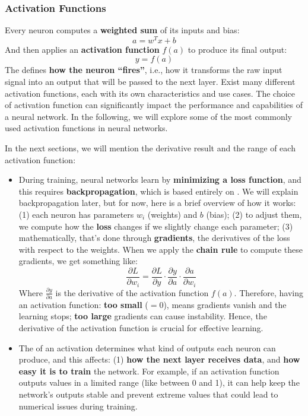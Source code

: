 \subsubsection{Activation Functions}

Every neuron computes a \textbf{weighted sum} of its inputs and bias:
\begin{equation*}
    a = w^{T} x + b
\end{equation*}
And then applies an \textbf{activation function} $f(a)$ to produce its final output:
\begin{equation*}
    y = f(a)
\end{equation*}
The  defines \textbf{how the neuron ``fires''}, i.e., how it transforms the raw input signal into an output that will be passed to the next layer. Exist many different activation functions, each with its own characteristics and use cases. The choice of activation function can significantly impact the performance and capabilities of a neural network. In the following, we will explore some of the most commonly used activation functions in neural networks.

\highspace
In the next sections, we will mention the derivative result and the range of each activation function:
\begin{itemize}
    \item During training, neural networks learn by \textbf{minimizing a loss function}, and this requires \textbf{backpropagation}, which is based entirely on . We will explain backpropagation later, but for now, here is a brief overview of how it works: (1) each neuron has parameters $w_i$ (weights) and $b$ (bias); (2) to adjust them, we compute how the \textbf{loss} changes if we slightly change each parameter; (3) mathematically, that's done through \textbf{gradients}, the derivatives of the loss with respect to the weights. When we apply the \textbf{chain rule} to compute these gradients, we get something like:
    \begin{equation*}
        \frac{\partial L}{\partial w_i} = \frac{\partial L}{\partial y} \cdot \frac{\partial y}{\partial a} \cdot \frac{\partial a}{\partial w_i}
    \end{equation*}
    Where $\frac{\partial y}{\partial a}$ is the derivative of the activation function $f(a)$. Therefore, having an activation function: \textbf{too small} ($=0$), means gradients vanish and the learning stops; \textbf{too large} gradients can cause instability. Hence, the derivative of the activation function is crucial for effective learning.

    \item The  of an activation determines what kind of outputs each neuron can produce, and this affects: (1) \textbf{how the next layer receives data}, and \textbf{how easy it is to train} the network. For example, if an activation function outputs values in a limited range (like between 0 and 1), it can help keep the network's outputs stable and prevent extreme values that could lead to numerical issues during training.
\end{itemize}

